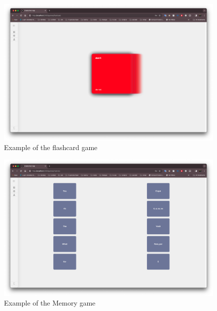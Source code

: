 \documentclass[12pt]{article}
\begin{document}
    \begin{figure}
      \centering
      \caption{
      Example of the flashcard game 
      }
      \label{fig:site6}
      \includegraphics[width=1\textwidth]{assets/6.png}
    \end{figure}


    \begin{figure}
      \centering
      \caption{
      Example of the Memory game 
      }
      \label{fig:site7}
      \includegraphics[width=1\textwidth]{assets/7.png}
    \end{figure}
\end{document}
